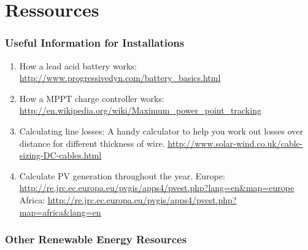 \documentclass{article}
\theoremstyle{definition}
\theoremstyle{definition}
\theoremstyle{remark}
\begin{document}

{\color{blue}\section{Ressources}} %
\label{sec:ressources}

  \subsubsection{Useful Information for Installations} %
  \label{ssub:useful_information_for_installations}

    \begin{enumerate}
      \item How a lead acid battery works: \href{http://www.progressivedyn.com/battery\_basics.html}{\underline{http://www.progressivedyn.com/battery\_basics.html}}
      \item How a MPPT charge controller works: \newline
      \href{http://en.wikipedia.org/wiki/Maximum\_power\_point\_tracking}{\underline{http://en.wikipedia.org/wiki/Maximum\_power\_point\_tracking}}
      \item Calculating line losses: A handy calculator to help you work out losses over distance for different \newline
      thickness of wire. \href{http://www.solar-wind.co.uk/cable-sizing-DC-cables.html}{\underline{http://www.solar-wind.co.uk/cable-sizing-DC-cables.html}}
      \item Calculate PV generation throughout the year. \newline
      Europe: \href{http://re.jrc.ec.europa.eu/pvgis/apps4/pvest.php?lang=en\&map=europe}{\underline{http://re.jrc.ec.europa.eu/pvgis/apps4/pvest.php?lang=en\&map=europe}} \newline
      Africa: \href{http://re.jrc.ec.europa.eu/pvgis/apps4/pvest.php?map=africa\&lang=en}{\underline{http://re.jrc.ec.europa.eu/pvgis/apps4/pvest.php?map=africa\&lang=en}}
    \end{enumerate}
  

  \subsubsection{Other Renewable Energy Resources} %
  \label{ssub:other_renewable_energy_resources}
  
\end{document}
